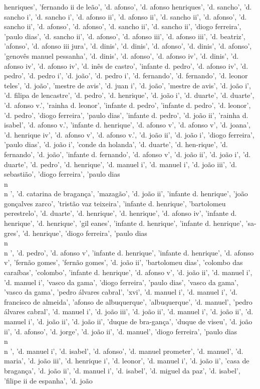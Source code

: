 \documentclass{article}
\begin{document}
\begin{itemize}
henriques', 'fernando ii de leão', 'd. afonso', 'd. afonso henriques', 'd. sancho', 'd. sancho i', 'd. sancho i', 'd. afonso ii', 'd. afonso ii', 'd. sancho ii', 'd. afonso', 'd. sancho ii', 'd. afonso', 'd. afonso', 'd. sancho ii', 'd. sancho ii', 'diogo ferreira', 'paulo dias', 'd. sancho ii', 'd. afonso', 'd. afonso iii', 'd. afonso iii', 'd. beatriz', 'afonso', 'd. afonso iii jura', 'd. dinis', 'd. dinis', 'd. afonso', 'd. dinis', 'd. afonso', 'genovês manuel pessanha', 'd. dinis', 'd. afonso', 'd. afonso iv', 'd. dinis', 'd. afonso iv', 'd. afonso iv', 'd. inês de castro', 'infante d. pedro', 'd. afonso iv', 'd. pedro', 'd. pedro i', 'd. joão', 'd. pedro i', 'd. fernando', 'd. fernando', 'd. leonor teles', 'd. joão', 'mestre de avis', 'd. juan i', 'd. joão', 'mestre de avis', 'd. joão i', 'd. filipa de lencastre', 'd. pedro', 'd. henrique', 'd. joão i', 'd. duarte', 'd. duarte', 'd. afonso v.', 'rainha d. leonor', 'infante d. pedro', 'infante d. pedro', 'd. leonor', 'd. pedro', 'diogo ferreira', 'paulo dias', 'infante d. pedro', 'd. joão ii', 'rainha d. isabel', 'd. afonso v.', 'infante d. henrique', 'd. afonso v', 'd. afonso v', 'd. joana', 'd. henrique iv', 'd. afonso v', 'd. afonso v.', 'd. joão ii', 'd. joão i', 'diogo ferreira', 'paulo dias', 'd. joão i', 'conde da holanda', 'd. duarte', 'd. hen-rique', 'd. fernando', 'd. joão', 'infante d. fernando', 'd. afonso v', 'd. joão ii', 'd. joão i', 'd. duarte', 'd. pedro', 'd. henrique', 'd. manuel i', 'd. manuel i', 'd. joão iii', 'd. sebastião', 'diogo ferreira', 'paulo dias\\n\\n ', 'd. catarina de bragança', 'mazagão', 'd. joão ii', 'infante d. henrique', 'joão gonçalves zarco', 'tristão vaz teixeira', 'infante d. henrique', 'bartolomeu perestrelo', 'd. duarte', 'd. henrique', 'd. henrique', 'd. afonso iv', 'infante d. henrique', 'd. henrique', 'gil eanes', 'infante d. henrique', 'infante d. henrique', 'sa- gres', 'd. henrique', 'diogo ferreira', 'paulo dias\\n\\n ', 'd. pedro', 'd. afonso v', 'infante d. henrique', 'infante d. henrique', 'd. afonso v', 'fernão gomes', 'fernão gomes', 'd. joão ii', 'bartolomeu dias', 'colombo das caraíbas', 'colombo', 'infante d. henrique', 'd. afonso v', 'd. joão ii', 'd. manuel i', 'd. manuel i', 'vasco da gama', 'diogo ferreira', 'paulo dias', 'vasco da gama', 'vasco da gama', 'pedro álvares cabral', 'xvi', 'd. manuel i', 'd. manuel i', 'd. francisco de almeida', 'afonso de albuquerque', 'albuquerque', 'd. manuel', 'pedro álvares cabral', 'd. manuel i', 'd. joão iii', 'd. joão ii', 'd. manuel i', 'd. joão ii', 'd. manuel i', 'd. joão ii', 'd. joão ii', 'duque de bra-gança', 'duque de viseu', 'd. joão ii', 'd. afonso', 'd. jorge', 'd. joão ii', 'd. manuel', 'diogo ferreira', 'paulo dias\\n\\n ', 'd. manuel i', 'd. isabel', 'd. afonso', 'd. manuel prometer', 'd. manuel', 'd. maria', 'd. joão iii', 'd. henrique i', 'd. leonor', 'd. manuel i', 'd. joão ii', 'casa de bragança', 'd. joão ii', 'd. manuel i', 'd. isabel', 'd. miguel da paz', 'd. isabel', 'filipe ii de espanha', 'd. joão 
\end{itemize}
\end{document}
